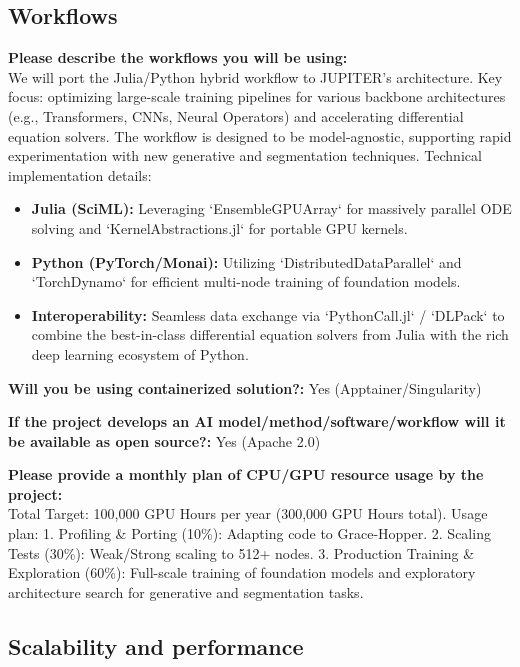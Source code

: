 \documentclass[12pt,a4paper]{article}
\begin{document}
\subsection*{Workflows}

\textbf{Please describe the workflows you will be using:} \\
We will port the Julia/Python hybrid workflow to JUPITER's architecture. Key focus: optimizing large-scale training pipelines for various backbone architectures (e.g., Transformers, CNNs, Neural Operators) and accelerating differential equation solvers. The workflow is designed to be model-agnostic, supporting rapid experimentation with new generative and segmentation techniques.
Technical implementation details:
\begin{itemize}
    \item \textbf{Julia (SciML):} Leveraging `EnsembleGPUArray` for massively parallel ODE solving and `KernelAbstractions.jl` for portable GPU kernels.
    \item \textbf{Python (PyTorch/Monai):} Utilizing `DistributedDataParallel` and `TorchDynamo` for efficient multi-node training of foundation models.
    \item \textbf{Interoperability:} Seamless data exchange via `PythonCall.jl` / `DLPack` to combine the best-in-class differential equation solvers from Julia with the rich deep learning ecosystem of Python.
\end{itemize}

\textbf{Will you be using containerized solution?:} Yes (Apptainer/Singularity)

\textbf{If the project develops an AI model/method/software/workflow will it be available as open source?:} Yes (Apache 2.0)

\textbf{Please provide a monthly plan of CPU/GPU resource usage by the project:} \\
Total Target: 100,000 GPU Hours per year (300,000 GPU Hours total).
Usage plan: 1. Profiling \& Porting (10\%): Adapting code to Grace-Hopper. 2. Scaling Tests (30\%): Weak/Strong scaling to 512+ nodes. 3. Production Training \& Exploration (60\%): Full-scale training of foundation models and exploratory architecture search for generative and segmentation tasks.

\subsection*{Scalability and performance}
\end{document}
